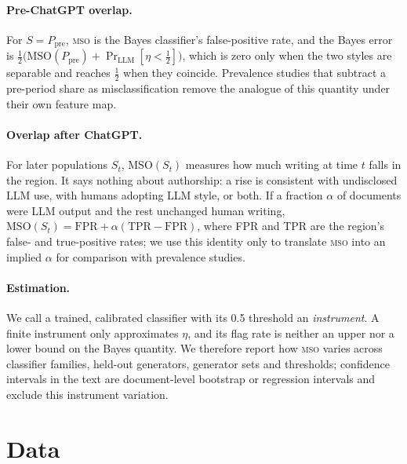\documentclass[11pt]{article}
\newcommand{\mso}{\textsc{mso}}
\begin{document}
\paragraph{Pre-ChatGPT overlap.}
For $S = P_{\text{pre}}$, \mso{} is the Bayes classifier's false-positive rate, and the Bayes error is
$\tfrac12\big(\mathrm{MSO}(P_{\text{pre}}) + \Pr_{\text{LLM}}[\eta < \tfrac12]\big)$, which is zero only when the
two styles are separable and reaches $\tfrac12$ when they coincide. Prevalence studies that subtract a
pre-period share as misclassification remove the analogue of this quantity under their own feature map.

\paragraph{Overlap after ChatGPT.}
For later populations $S_t$, $\mathrm{MSO}(S_t)$ measures how much writing at time $t$ falls in the region. It says nothing about authorship: a rise is consistent with undisclosed LLM use, with humans adopting LLM style, or both.
If a fraction $\alpha$ of documents were LLM output and the rest unchanged human writing,
$\mathrm{MSO}(S_t) = \mathrm{FPR} + \alpha(\mathrm{TPR} - \mathrm{FPR})$, where FPR and TPR are the region's false- and true-positive rates; we use this identity only to translate
\mso{} into an implied $\alpha$ for comparison with prevalence studies.

\paragraph{Estimation.}
We call a trained, calibrated classifier with its 0.5 threshold an \emph{instrument}. A finite instrument only
approximates $\eta$, and its flag rate is neither an upper nor a lower bound on the Bayes quantity. We therefore
report how \mso{} varies across classifier families, held-out generators, generator sets and thresholds;
confidence intervals in the text are document-level bootstrap or regression intervals and exclude this
instrument variation.

\section{Data}
\label{sec:data}
\end{document}
